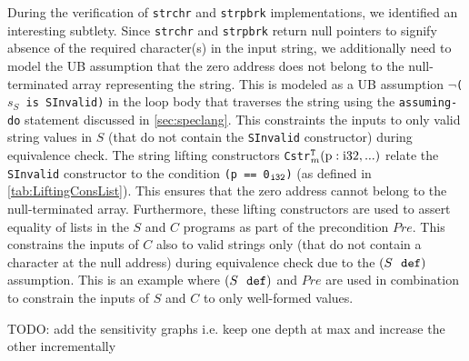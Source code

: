 During the verification of {\tt strchr} and {\tt strpbrk} implementations,
we identified an interesting subtlety. Since {\tt strchr} and {\tt strpbrk}
return null pointers to signify absence of the required character(s) in the input string,
we additionally need to model the UB assumption that the zero
address does not belong to the null-terminated array representing the string. This
is modeled as a UB assumption $\neg${\tt ($s_S$ is SInvalid)} in the loop body that traverses the string
using the {\tt assuming-do} statement discussed in \cref{sec:speclang}.
This constraints the inputs to only valid string values in $S$ (that do not contain the {\tt SInvalid} constructor)
during equivalence check.
The string lifting constructors {\tt Cstr}$_m^{\tt T}\mathrm{(p:i32,...)}$
relate the {\tt SInvalid} constructor to the condition {\tt (p == 0$_{\tt i32}$)} (as defined in \cref{tab:LiftingConsList}).
This ensures that the zero address cannot belong to the null-terminated array.
Furthermore, these lifting constructors are used to assert equality of lists in the $S$ and $C$ programs as
part of the precondition $Pre$.
This constrains the inputs of $C$ also to valid strings only (that do not contain a character at the null address)
during equivalence check due to the $(S\ \  \mathrm{\tt def})$ assumption.
This is an example where $(S\ \  \mathrm{\tt def})$
and $Pre$ are used in combination to constrain the inputs of $S$ and $C$ to only well-formed values.

TODO: add the sensitivity graphs i.e. keep one depth at max and increase the other incrementally